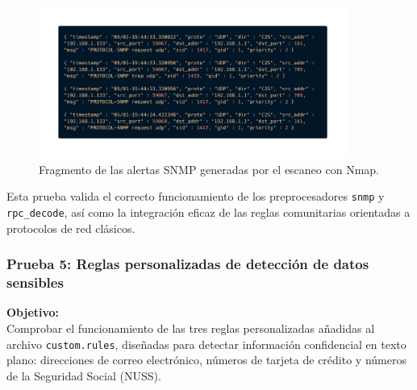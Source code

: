 \documentclass[11pt,a4paper,twoside]{report}
\begin{document}
\begin{table}[H]
	\centering
	\caption{Alertas generadas durante el escaneo SNMP contra el router.}
\end{table}

\begin{figure}[H]
	\centering
	\includegraphics[width=0.9\textwidth]{pruebas_bien/seccion_uno/4.png}
	\caption{Fragmento de las alertas SNMP generadas por el escaneo con Nmap.}
\end{figure}

Esta prueba valida el correcto funcionamiento de los preprocesadores \texttt{snmp} y \texttt{rpc\_decode}, así como la integración eficaz de las reglas comunitarias orientadas a protocolos de red clásicos.

\subsubsection*{Prueba 5: Reglas personalizadas de detección de datos sensibles}

\textbf{Objetivo:} \\
Comprobar el funcionamiento de las tres reglas personalizadas añadidas al archivo \texttt{custom.rules}, diseñadas para detectar información confidencial en texto plano: direcciones de correo electrónico, números de tarjeta de crédito y números de la Seguridad Social (NUSS).\newline
\end{document}
